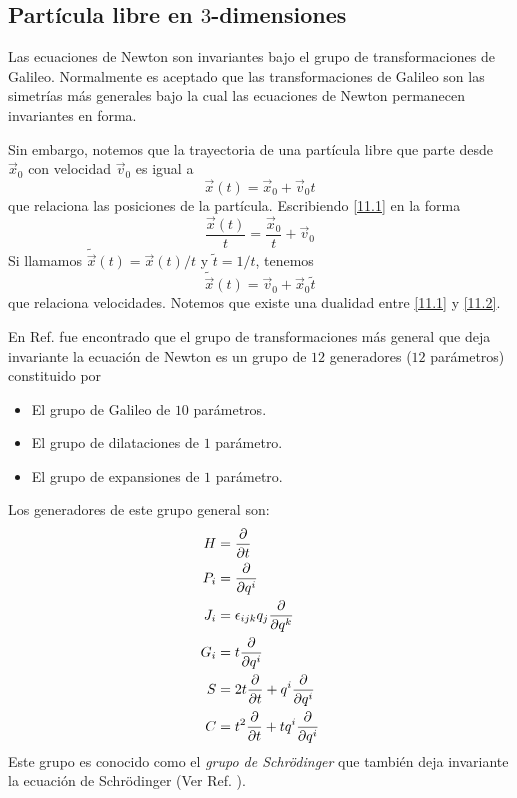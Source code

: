 \subsection{Partícula libre en $3$-dimensiones}
Las ecuaciones de Newton son invariantes bajo el grupo de transformaciones de Galileo. Normalmente es aceptado que las transformaciones de Galileo son las simetrías más generales bajo la cual las ecuaciones de Newton permanecen invariantes en forma.

Sin embargo, notemos que la trayectoria de una partícula libre que parte desde $\vec{x}_0$ con velocidad $\vec{v}_0$ es igual a 
\begin{equation}\label{11.1}
  \vec{x}(t)=\vec{x}_0+\vec{v}_0t
\end{equation}
que relaciona las posiciones de la partícula. Escribiendo \eqref{11.1} en la forma
\begin{equation}\label{11.2}
  \frac{\vec{x}(t)}{t}=\frac{\vec{x}_0}{t}+\vec{v}_0
\end{equation}
Si llamamos $\tilde{\vec{x}}(t)=\vec{x}(t)/t$ y $\tilde{t}=1/t$, tenemos
\begin{equation}
  \tilde{\vec{x}}(t)=\vec{v}_0+\vec{x}_0\tilde{t}
\end{equation}
que relaciona velocidades. Notemos que existe una dualidad entre \eqref{11.1} y \eqref{11.2}.

En Ref. \cite{Jahn:2001qk} fue encontrado que el grupo de transformaciones más general que deja invariante la ecuación de Newton es un grupo de $12$ generadores ($12$ parámetros) constituido por
\begin{itemize}
	\item El grupo de Galileo de $10$ parámetros.
	\item El grupo de dilataciones de $1$ parámetro.
	\item El grupo de expansiones de $1$ parámetro.
\end{itemize}

 Los generadores de este grupo general son:
\begin{align*}
  H&=\pdv{t}\\
  P_i&=\pdv{q^{i}}\\
  J_i&=\epsilon_{ijk}q_j\pdv{q^k}\\
  G_i&=t\pdv{q^{i}}\\
  S&=2t\pdv{t}+q^{i}\pdv{q^{i}}\\
  C&=t^2\pdv{t}+tq^{i}\pdv{q^{i}}
\end{align*}
Este grupo es conocido como el \textit{grupo de Schrödinger} que también deja invariante la ecuación de Schrödinger (Ver Ref. \cite{Niederer:1972zz}).

